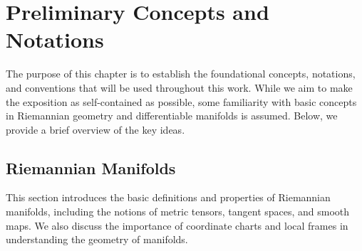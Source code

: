 \pagestyle{MyFancy}
\color{gal}
\chapter{Preliminary Concepts and Notations}
\label{cap:preliminares}



\ifpdf
    \graphicspath{{Chapter1/figs/Raster/}{Chapter1/figs/PDF/}{Chapter1/figs/}}
\else
    \graphicspath{{Chapter1/figs/Vector/}{Chapter1/figs/}}
\fi

\PlaceText{69mm}{39mm}{ \color{gal}\noindent\makebox[\linewidth]{\rule{2\paperwidth}{1pt}}}

\PlaceText{69mm}{79mm}{ \color{gal}\noindent\makebox[\linewidth]{\rule{2\paperwidth}{1pt}}}

\color{black}
The purpose of this chapter is to establish the foundational concepts, notations, and conventions that will be used throughout this work. While we aim to make the exposition as self-contained as possible, some familiarity with basic concepts in Riemannian geometry and differentiable manifolds is assumed. Below, we provide a brief overview of the key ideas.

\section{Riemannian Manifolds}
\PlaceText{15mm}{13mm}{ \color{white}\noindent\makebox[\linewidth]{\rule{2\paperwidth}{10pt}}}
\vspace{-1.5cm}
\begin{oobs}
This section introduces the basic definitions and properties of Riemannian manifolds, including the notions of metric tensors, tangent spaces, and smooth maps. We also discuss the importance of coordinate charts and local frames in understanding the geometry of manifolds.
\end{oobs}

